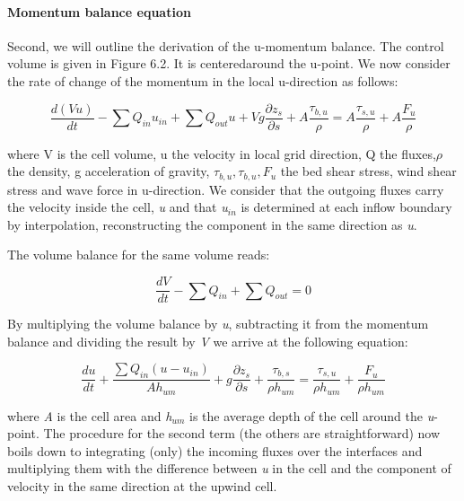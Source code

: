 \documentclass{article}
\begin{document}
\paragraph{ Momentum balance equation}

\noindent Second, we will outline the derivation of the u-momentum balance. The control volume is given in Figure 6.2.  It is centeredaround the u-point. We now consider the rate of change of the momentum in the local u-direction as follows:

\noindent 
\begin{equation} \label{6.6)} 
\frac{d\left(Vu\right)}{dt} -\sum Q_{in} u_{in}  +\sum Q_{out} u +Vg\frac{\partial z_{s} }{\partial s} +A\frac{\tau _{b,u} }{\rho } =A\frac{\tau _{s,u} }{\rho } +A\frac{F_{u} }{\rho }  
\end{equation} 


where V is the cell volume, u the velocity in local grid direction, Q the fluxes,$\rho $ the density, g acceleration of gravity, $\tau _{b,u} ,\tau _{b,u} ,F_{u} $ the bed shear stress, wind shear stress and wave force in u-direction. We consider that the outgoing fluxes carry the velocity inside the cell, \textit{u }and that \textit{u${}_{in}$ }is determined at each inflow boundary by interpolation, reconstructing the component in the same direction as \textit{u}.

The volume  balance for the same volume reads:

\noindent 
\begin{equation} \label{6.7)} 
\frac{dV}{dt} -\sum Q_{in} + \sum Q_{out} =0  
\end{equation} 


\noindent By multiplying the volume balance by \textit{u}, subtracting it from the momentum balance and dividing the result by \textit{V } we arrive at the following equation:

\noindent 
\begin{equation} \label{6.8)} 
\frac{du}{dt} +\frac{\sum Q_{in} \left(u-u_{in} \right) }{Ah_{um} } +g\frac{\partial z_{s} }{\partial s} +\frac{\tau _{b,s} }{\rho h_{um} } =\frac{\tau _{s,u} }{\rho h_{um} } +\frac{F_{u} }{\rho h_{um} }  
\end{equation} 


\noindent where \textit{A } is the cell area and \textit{h${}_{um}$} is the average depth of the cell around the \textit{u}-point. The procedure for the second term (the others are straightforward) now boils down to integrating (only) the incoming fluxes over the interfaces and multiplying them with the difference between \textit{u }in the cell and the component of velocity in the same direction at the upwind cell. 
\end{document}
